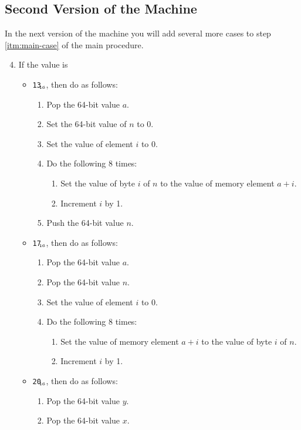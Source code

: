 \documentclass[a4paper,12pt]{article}
\newcommand{\num}[1]{\texttt{#1}\xspace}
\newcommand{\hex}[1]{\num{#1}$_{\textup{\tiny\hskip-1ex 16}}$\xspace}
\newcommand{\op}[1]{#1}
\newcommand{\LOADL}     [1]{\op{\hex{13}}\xspace}
\newcommand{\STOREL}    [1]{\op{\hex{17}}\xspace}
\newcommand{\ADD}       [1]{\op{\hex{20}}\xspace}
\begin{document}
\subsection{Second Version of the Machine}

In the next version of the machine you will add several more cases to step \ref{itm:main-case} of the main procedure.


\begin{enumerate}
  \setcounter{enumi}{3}
\item If the value is
  \begin{itemize}
  \item \LOADL{}, then do as follows:
    \begin{enumerate}
    \item Pop the 64-bit value $a$.
    \item Set the 64-bit value of $n$ to 0.
    \item Set the value of element $i$ to 0.
    \item Do the following 8 times:
      \begin{enumerate}
      \item Set the value of byte $i$ of $n$ to the value of memory element $a + i$.
      \item Increment $i$ by 1.
      \end{enumerate}
    \item Push the 64-bit value $n$.
    \end{enumerate}
  \item \STOREL{}, then do as follows:
    \begin{enumerate}
    \item Pop the 64-bit value $a$.
    \item Pop the 64-bit value $n$.
    \item Set the value of element $i$ to 0.
    \item Do the following 8 times:
      \begin{enumerate}
      \item Set the value of memory element $a + i$ to the value of byte $i$ of $n$.
      \item Increment $i$ by 1.
      \end{enumerate}
    \end{enumerate}
  \item \ADD{}, then do as follows:
    \begin{enumerate}
    \item Pop the 64-bit value $y$.
    \item Pop the 64-bit value $x$.

\end{enumerate}
\end{itemize}
\end{enumerate}
\end{document}
